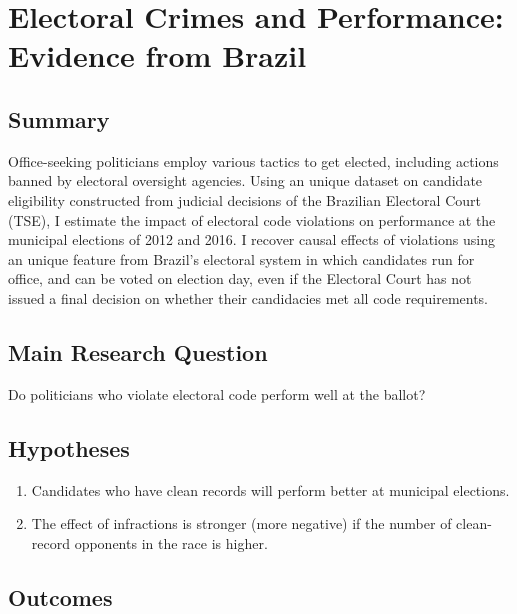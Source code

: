 \documentclass[]{article}
\title{}
\author{}
\date{}
\begin{document}
\hypertarget{title1}{%
\section{Electoral Crimes and Performance: Evidence from
Brazil}\label{title1}}

\hypertarget{summary}{%
\subsection{Summary}\label{summary}}

Office-seeking politicians employ various tactics to get elected,
including actions banned by electoral oversight agencies. Using an
unique dataset on candidate eligibility constructed from judicial
decisions of the Brazilian Electoral Court (TSE), I estimate the impact
of electoral code violations on performance at the municipal elections
of 2012 and 2016. I recover causal effects of violations using an unique
feature from Brazil's electoral system in which candidates run for
office, and can be voted on election day, even if the Electoral Court
has not issued a final decision on whether their candidacies met all
code requirements.

\hypertarget{main-research-question}{%
\subsection{Main Research Question}\label{main-research-question}}

Do politicians who violate electoral code perform well at the ballot?

\hypertarget{hypotheses}{%
\subsection{Hypotheses}\label{hypotheses}}

\begin{enumerate}
\item
  Candidates who have clean records will perform better at municipal
  elections.
\item
  The effect of infractions is stronger (more negative) if the number of
  clean-record opponents in the race is higher.
\end{enumerate}

\hypertarget{outcomes}{%
\subsection{Outcomes}\label{outcomes}}
\end{document}
